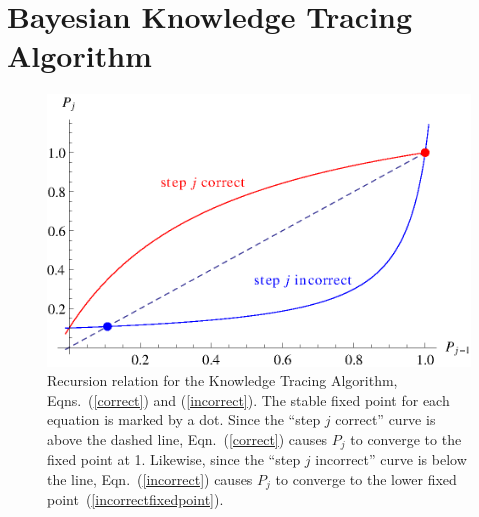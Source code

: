 \documentclass{acmlarge-edm}
\begin{document}
\section{Bayesian Knowledge Tracing Algorithm}

\begin{figure}
\centering\includegraphics{p-recursion.eps}
\caption{
 Recursion relation for the Knowledge Tracing Algorithm, 
  Eqns.~(\ref{correct}) and (\ref{incorrect}).
  The stable fixed point for each equation is marked
 by a dot.  Since the ``step $j$ correct'' curve is above the
  dashed line, Eqn.~(\ref{correct}) causes $P_j$ to converge to the fixed point at 1.  Likewise, since 
   the ``step $j$ incorrect'' curve is below the line, 
   Eqn.~(\ref{incorrect}) causes $P_j$ to converge to the lower fixed point~(\ref{incorrectfixedpoint}).
 }
 \label{p-recursion}
\end{figure}
\end{document}
